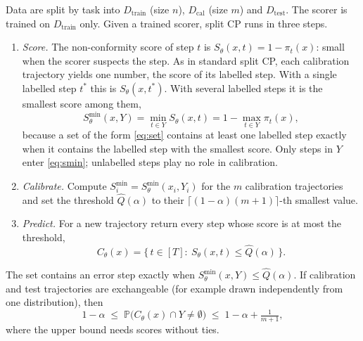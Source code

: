 \documentclass[10pt,a4paper]{article}
\newcommand{\Prob}{\mathbb{P}}
\newcommand{\C}{C}
\newcommand{\Qhat}{\widehat Q}
\newcommand{\Smin}{S^{\min}}
\newcommand{\Dtr}{D_{\mathrm{train}}}
\newcommand{\Dcal}{D_{\mathrm{cal}}}
\newcommand{\Dtest}{D_{\mathrm{test}}}
\newcommand{\cmt}[1]{\textcolor{purple}{[\textsc{Note:} #1}]}
\begin{document}
Data are split by task into $\Dtr$ (size $n$), $\Dcal$ (size $m$) and $\Dtest$. The scorer is trained on $\Dtr$ only. Given a trained scorer, split CP \cite{angelopoulos2021gentle} runs in three steps.
\begin{enumerate}
\item \emph{Score.} The non-conformity score of step $t$ is $S_\theta(x,t)=1-\pi_t(x)$: small when the scorer suspects the step. As in standard split CP, each calibration trajectory yields one number, the score of its labelled step. With a single labelled step $t^{*}$ this is $S_\theta(x,t^{*})$. With several labelled steps it is the smallest score among them,
\begin{equation}
\Smin_\theta(x,Y)=\min_{t\in Y}S_\theta(x,t)=1-\max_{t\in Y}\pi_t(x), \label{eq:smin}
\end{equation}
because a set of the form \eqref{eq:set} contains at least one labelled step exactly when it contains the labelled step with the smallest score. Only steps in $Y$ enter \eqref{eq:smin}; unlabelled steps play no role in calibration.
\item \emph{Calibrate.} Compute $\Smin_i=\Smin_\theta(x_i,Y_i)$ for the $m$ calibration trajectories and set the threshold $\Qhat(\alpha)$ to their $\lceil(1-\alpha)(m+1)\rceil$-th smallest value.
\item \emph{Predict.} For a new trajectory return every step whose score is at most the threshold,
\begin{equation}
\C_\theta(x)=\{\,t\in[T]:\ S_\theta(x,t)\le\Qhat(\alpha)\,\}. \label{eq:set}
\end{equation}
\end{enumerate}
The set contains an error step exactly when $\Smin_\theta(x,Y)\le\Qhat(\alpha)$. If calibration and test trajectories are exchangeable (for example drawn independently from one distribution), then
\begin{equation}
1-\alpha\;\le\;\Prob\big(\C_\theta(x)\cap Y\neq\emptyset\big)\;\le\;1-\alpha+\tfrac{1}{m+1}, \label{eq:guarantee}
\end{equation}
where the upper bound needs scores without ties. 
\end{document}
